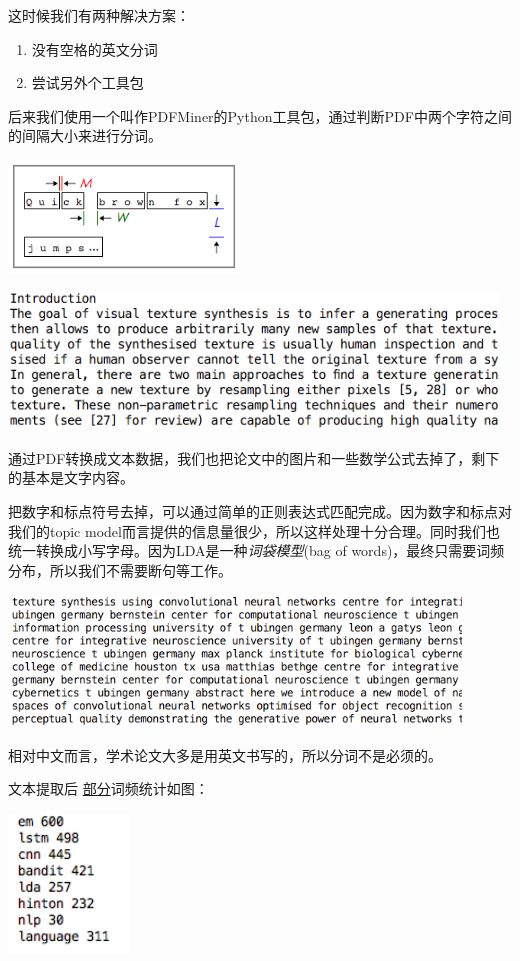 \documentclass{article}
\begin{document}
这时候我们有两种解决方案：
\begin{enumerate}
	\item	没有空格的英文分词
	\item	尝试另外个工具包
\end{enumerate}

后来我们使用一个叫作PDFMiner的Python工具包，通过判断PDF中两个字符之间的间隔大小来进行分词。
\begin{center}
\includegraphics[height=3cm]{section3/2}

\includegraphics[width=13cm]{section3/3}
\end{center}

通过PDF转换成文本数据，我们也把论文中的图片和一些数学公式去掉了，剩下的基本是文字内容。

把数字和标点符号去掉，可以通过简单的正则表达式匹配完成。因为数字和标点对我们的topic model而言提供的信息量很少，所以这样处理十分合理。同时我们也统一转换成小写字母。因为LDA是一种\emph{词袋模型}(bag of words)，最终只需要词频分布，所以我们不需要断句等工作。
\begin{center}
\includegraphics[width = 12cm]{section3/4}
\end{center}

相对中文而言，学术论文大多是用英文书写的，所以分词不是必须的。

文本提取后 \underline{部分}词频统计如图：
\begin{center}
\includegraphics[height = 3.7cm]{section3/demo_word}
\end{center}
\end{document}
